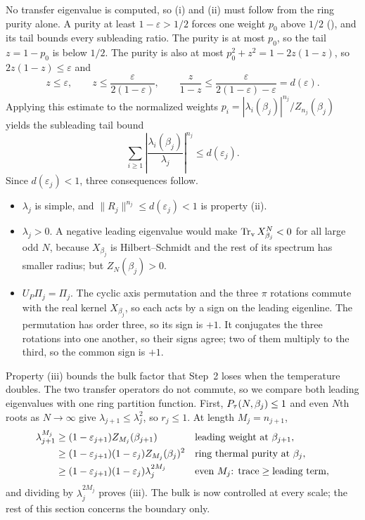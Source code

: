 No transfer eigenvalue is computed, so (i) and (ii) must follow from
the ring purity alone. A purity at least $1-\varepsilon>1/2$ forces one
weight $p_0$ above $1/2$ (\dominantglyph), and its tail bounds every
subleading ratio. The purity is at most $p_0$,
so the tail $z=1-p_0$ is below $1/2$. The purity is also at most
$p_0^2+z^2=1-2z(1-z)$, so $2z(1-z)\le\varepsilon$ and
\[
    z\le\varepsilon,\qquad
    z\le\frac{\varepsilon}{2(1-\varepsilon)},\qquad
    \frac{z}{1-z}\le\frac{\varepsilon}{2(1-\varepsilon)-\varepsilon}=d(\varepsilon).
\]
Applying this estimate to the normalized weights
$p_i=|\lambda_i(\beta_j)|^{n_j}/Z_{n_j}(\beta_j)$ yields the subleading tail bound
\begin{equation}
    \sum_{i\ge1}
    \left|\frac{\lambda_i(\beta_j)}{\lambda_j}\right|^{n_j}
    \le d(\varepsilon_j).
    \label{obc:full-tail}
\end{equation}
Since $d(\varepsilon_j)<1$, three consequences follow.
\begin{itemize}
    \item $\lambda_j$ is simple, and $\|R_j\|^{n_j}\le d(\varepsilon_j)<1$
          is property (ii).
    \item $\lambda_j>0$. A negative leading eigenvalue would make
          $\operatorname{Tr}_{\mathrm v} X_{\beta_j}^N<0$ for all large odd $N$, because $X_{\beta_j}$ is
          Hilbert--Schmidt and the rest of its spectrum has smaller radius;
          but $Z_N(\beta_j)>0$.
    \item $U_P\Pi_j=\Pi_j$. The cyclic axis permutation and the three $\pi$
          rotations commute with the real kernel $X_{\beta_j}$, so each acts by a
          sign on the leading eigenline. The permutation has order three, so its
          sign is $+1$. It conjugates the three rotations into one another, so
          their signs agree; two of them multiply to the third, so the common
          sign is $+1$.
\end{itemize}

Property (iii) bounds the bulk factor that Step~2 loses when the
temperature doubles. The two transfer operators do not commute, so we
compare both leading eigenvalues with one ring partition function.
First, $P_{\tau}(N,\beta_j)\le1$ and even $N$th roots as $N\to\infty$
give $\lambda_{j+1}\le\lambda_j^2$, so $r_j\le1$. At length
$M_j=n_{j+1}$,
\begin{align}
    \lambda_{j+1}^{M_j}
     &\ge(1-\varepsilon_{j+1})Z_{M_j}(\beta_{j+1})
     &                                             &\text{leading weight at }\beta_{j+1},\notag\\
     &\ge(1-\varepsilon_{j+1})(1-\varepsilon_j)
    Z_{M_j}(\beta_j)^2
     &                                             &\text{ring thermal purity at }\beta_j,\notag\\
     &\ge(1-\varepsilon_{j+1})(1-\varepsilon_j)
    \lambda_j^{2M_j}
     &                                             &\text{even }M_j\text{: trace}\ge\text{leading term},
    \label{obc:bulk}
\end{align}
and dividing by $\lambda_j^{2M_j}$ proves (iii). The bulk is now
controlled at every scale; the rest of this section concerns the
boundary only.

